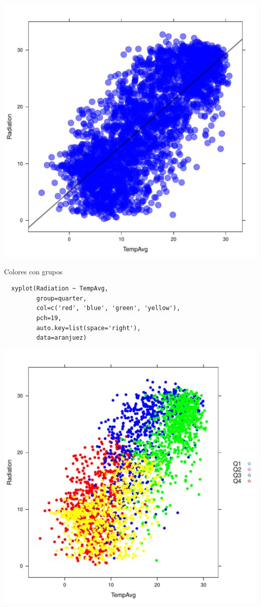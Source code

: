 \documentclass[xcolor={usenames,svgnames,dvipsnames}]{beamer}
\begin{document}
\begin{frame}[label=sec-2-1-19]{}
\includegraphics[width=.9\linewidth]{figs/xyplotColors.pdf}
\end{frame}

\begin{frame}[fragile,label=sec-2-1-20]{Colores con grupos}
 \lstset{language=R,label= ,caption= ,numbers=none}
\begin{lstlisting}
  xyplot(Radiation ~ TempAvg,
         group=quarter,
         col=c('red', 'blue', 'green', 'yellow'),
         pch=19,
         auto.key=list(space='right'),
         data=aranjuez)
\end{lstlisting}
\end{frame}

\begin{frame}[label=sec-2-1-21]{}
\includegraphics[width=.9\linewidth]{figs/xyplotColorGroups.pdf}
\end{frame}
\end{document}
